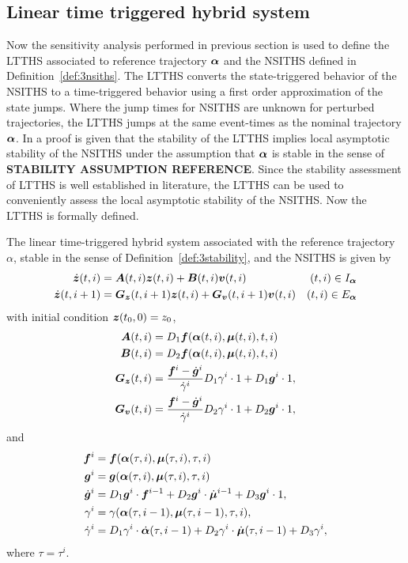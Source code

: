 \documentclass[../DC2017114Bouma.tex]{subfiles}
\begin{document}
\subsection{Linear time triggered hybrid system}
Now the sensitivity analysis performed in previous section is used to define the LTTHS associated to reference trajectory $\boldsymbol{\alpha}$ and the NSITHS defined in Definition~\ref{def:3nsiths}. The LTTHS converts the state-triggered behavior of the NSITHS to a time-triggered behavior using a first order approximation of the state jumps. Where the jump times for NSITHS are unknown for perturbed trajectories, the LTTHS jumps at the same event-times as the nominal trajectory $\boldsymbol{\alpha}$. In \cite{Rijnen2017} a proof is given that the stability of the LTTHS implies local asymptotic stability of the NSITHS under the assumption that $\boldsymbol{\alpha}$ is stable in the sense of \textbf{STABILITY ASSUMPTION REFERENCE}. Since the stability assessment of LTTHS is well established in literature, the LTTHS can be used to conveniently assess the local asymptotic stability of the NSITHS. Now the LTTHS is formally defined.
\begin{mydef}[LTTHS]
The linear time-triggered hybrid system associated with the reference trajectory $\alpha$, stable in the sense of Definition~\ref{def:3stability}, and the NSITHS is given by
\begin{align}
\dot{{\boldsymbol{z}}}(t,i) &= {\boldsymbol{A}}(t,i){\boldsymbol{z}}(t,i) + {\boldsymbol{B}}(t,i){\boldsymbol{v}}(t,i) &(t,i)\in I_{\boldsymbol{\alpha}}\\
\dot{{\boldsymbol{z}}}(t,i+1) &= {\boldsymbol{G}}_{{\boldsymbol{z}}}(t,i+1){\boldsymbol{z}}(t,i) +  {\boldsymbol{G}}_{{\boldsymbol{v}}}(t,i+1){\boldsymbol{v}}(t,i) &(t,i)\in E_{\boldsymbol{\alpha}}
\end{align}
with initial condition ${\boldsymbol{z}}(t_0,0)=z_0$,
\begin{align}
{\boldsymbol{A}}(t,i) &= D_1{\boldsymbol{f}}(\boldsymbol{\alpha}(t,i),\boldsymbol{\mu}(t,i),t,i)\\
{\boldsymbol{B}}(t,i) &= D_2{\boldsymbol{f}}(\boldsymbol{\alpha}(t,i),\boldsymbol{\mu}(t,i),t,i)\\
{\boldsymbol{G}}_{{\boldsymbol{z}}}(t,i) & = \frac{{\boldsymbol{f}}^i - \dot{{\boldsymbol{g}}}^i}{\dot{\gamma}^i}D_1\gamma^i\cdot 1 + D_1{\boldsymbol{g}}^i\cdot 1,\\
{\boldsymbol{G}}_{{\boldsymbol{v}}}(t,i) & = \frac{{\boldsymbol{f}}^i - \dot{{\boldsymbol{g}}}^i}{\dot{\gamma}^i}D_2\gamma^i\cdot 1 + D_2{\boldsymbol{g}}^i\cdot 1,
\end{align}
and
\begin{align}
{\boldsymbol{f}}^i &= {\boldsymbol{f}}(\boldsymbol{\alpha}(\tau,i),\boldsymbol{\mu}(\tau,i),\tau,i)\\
{\boldsymbol{g}}^i &= {\boldsymbol{g}}(\boldsymbol{\alpha}(\tau,i),\boldsymbol{\mu}(\tau,i),\tau,i)\\
\dot{{\boldsymbol{g}}}^i &= D_1{\boldsymbol{g}}^i\cdot {\boldsymbol{f}}^{i-1} + D_2{\boldsymbol{g}}^i\cdot \dot{\boldsymbol{\mu}}^{i-1} + D_3{\boldsymbol{g}}^i\cdot 1,\\
\gamma^i &= \gamma(\boldsymbol{\alpha}(\tau,i-1),\boldsymbol{\mu}(\tau,i-1),\tau,i),\\
\dot{\gamma}^i &= D_1\gamma^i\cdot\dot{\boldsymbol{\alpha}}(\tau,i-1) + D_2\gamma^i\cdot\dot{\boldsymbol{\mu}}(\tau,i-1) + D_3\gamma^i,
\end{align}
where $\tau = \tau^i$.
\end{mydef}
\end{document}
